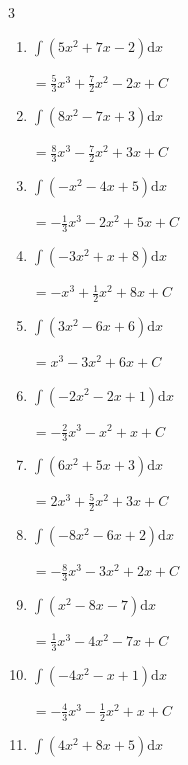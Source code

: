 \begin{multicols}{3}
\begin{enumerate}
  \item $\displaystyle \int \left( 5x^{2}+7x-2 \right) \mathrm{d}x$

        $\displaystyle =\frac{5}{3}x^{3}+\frac{7}{2}x^{2}-2x+ C$

  \item $\displaystyle \int \left( 8x^{2}-7x+3 \right) \mathrm{d}x$

        $\displaystyle =\frac{8}{3}x^{3}-\frac{7}{2}x^{2}+3x+ C$

  \item $\displaystyle \int \left( -x^{2}-4x+5 \right) \mathrm{d}x$

        $\displaystyle =-\frac{1}{3}x^{3}-2x^{2}+5x+ C$

  \item $\displaystyle \int \left( -3x^{2}+x+8 \right) \mathrm{d}x$

        $\displaystyle =-x^{3}+\frac{1}{2}x^{2}+8x+ C$

  \item $\displaystyle \int \left( 3x^{2}-6x+6 \right) \mathrm{d}x$

        $\displaystyle =x^{3}-3x^{2}+6x+ C$

  \item $\displaystyle \int \left( -2x^{2}-2x+1 \right) \mathrm{d}x$

        $\displaystyle =-\frac{2}{3}x^{3}-x^{2}+x+ C$

\columnbreak %

\resetques

  \item $\displaystyle \int \left( 6x^{2}+5x+3 \right) \mathrm{d}x$

        $\displaystyle =2x^{3}+\frac{5}{2}x^{2}+3x+ C$

  \item $\displaystyle \int \left( -8x^{2}-6x+2 \right) \mathrm{d}x$

        $\displaystyle =-\frac{8}{3}x^{3}-3x^{2}+2x+ C$

  \item $\displaystyle \int \left( x^{2}-8x-7 \right) \mathrm{d}x$

        $\displaystyle =\frac{1}{3}x^{3}-4x^{2}-7x+ C$

  \item $\displaystyle \int \left( -4x^{2}-x+1 \right) \mathrm{d}x$

        $\displaystyle =-\frac{4}{3}x^{3}-\frac{1}{2}x^{2}+x+ C$

  \item $\displaystyle \int \left( 4x^{2}+8x+5 \right) \mathrm{d}x$


\end{enumerate}
\end{multicols}

